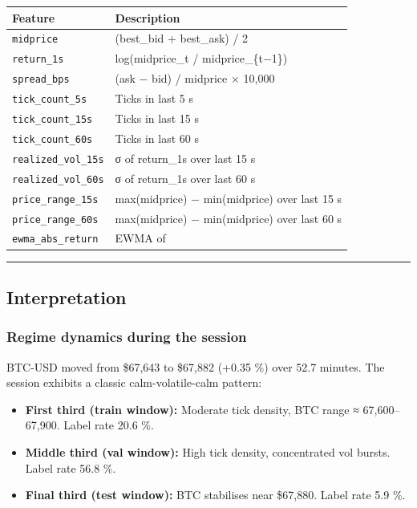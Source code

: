 \documentclass[
]{article}
\providecommand{\tightlist}{%
  \setlength{\itemsep}{0pt}\setlength{\parskip}{0pt}}
\begin{document}
\begin{longtable}[]{@{}ll@{}}
\toprule
Feature & Description \\
\midrule
\endhead
\texttt{midprice} & (best\_bid + best\_ask) / 2 \\
\texttt{return\_1s} & log(midprice\_t / midprice\_\{t−1\}) \\
\texttt{spread\_bps} & (ask − bid) / midprice × 10,000 \\
\texttt{tick\_count\_5s} & Ticks in last 5 s \\
\texttt{tick\_count\_15s} & Ticks in last 15 s \\
\texttt{tick\_count\_60s} & Ticks in last 60 s \\
\texttt{realized\_vol\_15s} & σ of return\_1s over last 15 s \\
\texttt{realized\_vol\_60s} & σ of return\_1s over last 60 s \\
\texttt{price\_range\_15s} & max(midprice) − min(midprice) over last 15
s \\
\texttt{price\_range\_60s} & max(midprice) − min(midprice) over last 60
s \\
\texttt{ewma\_abs\_return} & EWMA of \\
\bottomrule
\end{longtable}

\begin{center}\rule{0.5\linewidth}{0.5pt}\end{center}

\hypertarget{interpretation}{%
\subsection{Interpretation}\label{interpretation}}

\hypertarget{regime-dynamics-during-the-session}{%
\subsubsection{Regime dynamics during the
session}\label{regime-dynamics-during-the-session}}

BTC-USD moved from \$67,643 to \$67,882 (+0.35 \%) over 52.7 minutes.
The session exhibits a classic calm-volatile-calm pattern:

\begin{itemize}
\tightlist
\item
  \textbf{First third (train window):} Moderate tick density, BTC range
  ≈ 67,600--67,900. Label rate 20.6 \%.
\item
  \textbf{Middle third (val window):} High tick density, concentrated
  vol bursts. Label rate 56.8 \%.
\item
  \textbf{Final third (test window):} BTC stabilises near \$67,880.
  Label rate 5.9 \%.
\end{itemize}
\end{document}

